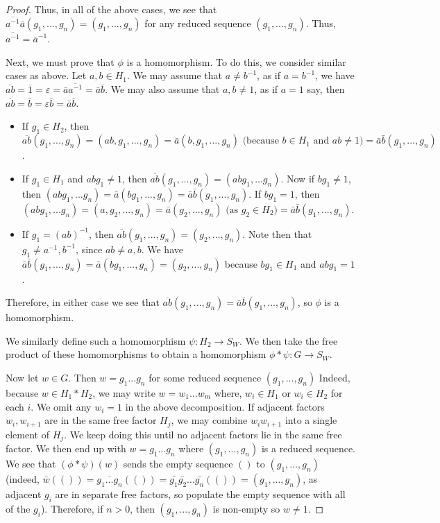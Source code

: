 \documentclass[12pt]{article}
\newcommand{\vs}{\vskip10pt}
\begin{document}
\begin{proof}
	Thus, in all of the above cases, we see that $\overline{a^{-1}} \bar{a} (g_1,...,g_n) = (g_1,...,g_n)$ for any reduced sequence $(g_1,...,g_n)$. Thus, $\overline{a^{-1}} = \bar{a}^{-1}$. 
	
	\vs
	
	Next, we must prove that $\phi$ is a homomorphism. To do this, we consider similar cases as above. Let $a,b \in H_1$. We may assume that $a \neq b^{-1}$, as if $a=b^{-1}$, we have $\overline{a b} = \overline{1} = \varepsilon = \bar{a} \overline{a^{-1}} = \bar{a} \bar{b}$. We may also assume that $a,b \neq 1$, as if $a = 1$ say, then $\overline{ab} = \bar{b} = \varepsilon \bar{b} = \bar{a} \bar{b}$. 
	
	\begin{itemize}
		\item If $g_1 \in H_2$, then $\overline{a b} (g_1,...,g_n) = (ab, g_1,...,g_n) = \bar{a}(b, g_1,...,g_n) \text{ (because } b \in H_1 \text{ and } ab \neq 1) = \bar{a} \bar{b} (g_1,...,g_n)$.
		\item If $g_1 \in H_1$ and $abg_1 \neq 1$, then $\overline{a b} (g_1,...,g_n) = (abg_1,...g_n)$. Now if $b g_1 \neq 1$, then $(abg_1,...g_n) = \bar{a} (bg_1,...,g_n) = \bar{a} \bar{b} (g_1,...,g_n)$. If $bg_1 = 1$, then $(abg_1,...g_n) = (a, g_2,...,g_n) = \bar{a} (g_2,...,g_n) \text{ (as } g_2 \in H_2) = \bar{a} \bar{b} (g_1,...,g_n)$. 
		\item If $g_1 = (ab)^{-1}$, then $\overline{a b} (g_1,...,g_n) = (g_2,...,g_n)$. Note then that $g_1 \neq a^{-1}, b^{-1}$, since $ab \neq a,b$. We have $\bar{a} \bar{b} (g_1,...,g_n) = \bar{a} (bg_1,...,g_n) = (g_2,...,g_n)$ because $bg_1 \in H_1$ and $ab g_1 = 1$. 
	\end{itemize}

	Therefore, in either case we see that $\overline{a b} (g_1,...,g_n) = \bar{a} \bar{b} (g_1,...,g_n)$, so $\phi$ is a homomorphism. 
		
		We similarly define such a homomorphism $\psi: H_2 \rightarrow S_W$. We then take the free product of these homomorphisms to obtain a homomorphism $\phi * \psi: G \rightarrow S_W$. 
		
		\vs 
		
		Now let $w \in G$. Then $w = g_1...g_n$ for some reduced sequence $(g_1,...,g_n)$ Indeed, because $w \in H_1 * H_2$, we may write $w = w_1...w_m$ where, $w_i \in H_1$ or $w_i \in H_2$ for each $i$. We omit any $w_i = 1$ in the above decomposition. If adjacent factors $w_i, w_{i+1}$ are in the same free factor $H_j$, we may combine $w_i w_{i+1}$ into a single element of $H_j$. We keep doing this until no adjacent factors lie in the same free factor. We then end up with $w = g_1 ... g_n$ where $(g_1,...,g_n)$ is a reduced sequence. We see that $(\phi * \psi)(w)$ sends the empty sequence $()$ to $(g_1,...,g_n)$ (indeed, $\bar{w}(()) = \overline{g_1 ... g_n}(()) = \bar{g_1} \bar{g_2}...\bar{g_n} (()) = (g_1,...,g_n)$, as adjacent $g_i$ are in separate free factors, so populate the empty sequence with all of the $g_i$). Therefore, if $n > 0$, then $(g_1,...,g_n)$ is non-empty so $w \neq 1$. 
		
	\end{proof}
\end{document}
